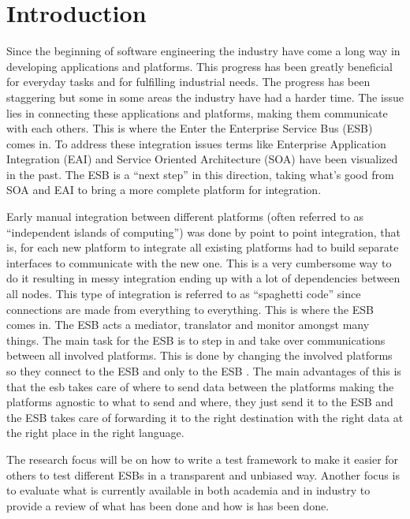 \section{Introduction} %

Since the beginning of software engineering the industry have come a long way in developing applications and platforms. 
This progress has been greatly beneficial for everyday tasks and for fulfilling industrial needs. 
The progress has been staggering but some in some areas the industry have had a harder time. 
The issue lies in connecting these applications and platforms, making them communicate with each others. This is where the Enter the Enterprise Service Bus (ESB) \cite{falko07} comes in. 
To address these integration issues terms like Enterprise Application Integration (EAI) and Service Oriented Architecture (SOA) have been visualized in the past. 
The ESB is a ``next step'' in this direction, taking what's good from SOA and EAI to bring a more complete platform for integration.

Early manual integration between different platforms (often referred to as ``independent islands of computing'') was done by point to point integration, that is, for each new platform to integrate all existing platforms had to build separate interfaces to communicate with the new one. 
This is a very cumbersome way to do it resulting in messy integration ending up with a lot of dependencies between all nodes.
This type of integration is referred to as ``spaghetti code'' since connections are made from everything to everything. 
This is where the ESB comes in. The ESB acts a mediator, translator and monitor amongst many things. The main task for the ESB is to step in and take over communications between all involved platforms. 
This is done by changing the involved platforms so they connect to the ESB and only to the ESB \cite{Sanjay2011}. 
The main advantages of this is that the esb takes care of where to send data between the platforms making the platforms agnostic to what to send and where, they just send it to the ESB and the ESB takes care of forwarding it to the right destination with the right data at the right place in the right language.

The research focus will be on how to write a test framework to make it easier for others to test different ESBs in a transparent and unbiased way. 
Another focus is to evaluate what is currently available in both academia and in industry to provide a review of what has been done and how is has been done.

